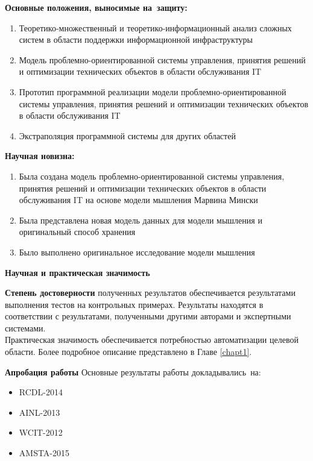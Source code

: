 \textbf{Основные положения, выносимые на~защиту:}
\begin{enumerate}
  \item Теоретико-множественный и теоретико-информационный анализ сложных систем в области поддержки информационной инфраструктуры
  \item Модель проблемно-ориентированной системы управления, принятия решений и оптимизации технических объектов в области обслуживания IT  
  \item Прототип программной реализации модели проблемно-ориентированной системы управления, принятия решений и оптимизации технических объектов в области обслуживания IT  
  \item Экстраполяция программной системы для других областей
\end{enumerate}

\textbf{Научная новизна:}
\begin{enumerate}
  \item Была создана модель проблемно-ориентированной системы управления, принятия решений и оптимизации технических объектов в области обслуживания IT на основе модели мышления Марвина Мински
  \item Была представлена новая модель данных для модели мышления и оригинальный способ хранения 
  \item Было выполнено оригинальное исследование модели мышления 
\end{enumerate}

\textbf{Научная и практическая значимость} 

\textbf{Степень достоверности} полученных результатов обеспечивается результатами выполнения тестов на контрольных примерах. Результаты находятся в соответствии с результатами, полученными другими авторами и экспертными системами. \\
Практическая значимость обеспечивается потребностью автоматизации целевой области. Более подробное описание представлено в Главе \ref{chapt1}.

\textbf{Апробация работы}
Основные результаты работы докладывались~на:
\begin{itemize}
	\item RCDL-2014
	\item AINL-2013
	\item WCIT-2012
	\item AMSTA-2015
\end{itemize}


